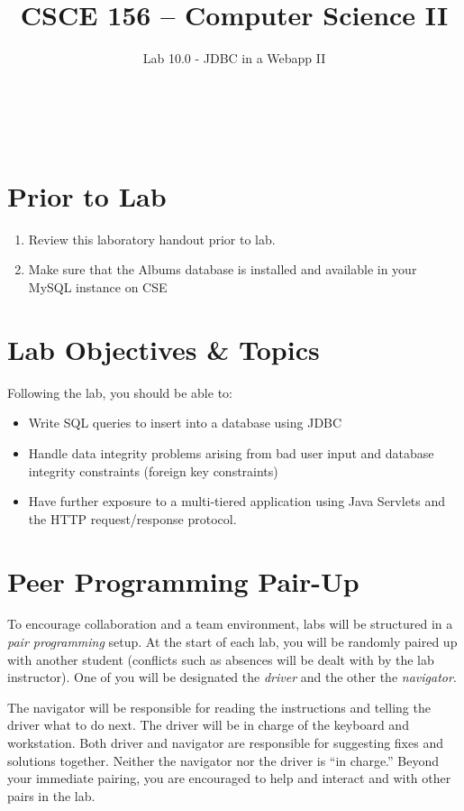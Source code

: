 \documentclass[12pt]{scrartcl}
\title{CSCE 156 -- Computer Science II}
\subtitle{Lab 10.0 - JDBC in a Webapp II}
\author{~}
\date{~}
\begin{document}
\maketitle

\section*{Prior to Lab}

\begin{enumerate}
  \item Review this laboratory handout prior to lab.
  \item Make sure that the Albums database is installed and available 
  	in your MySQL instance on CSE
\end{enumerate}

\section*{Lab Objectives \& Topics}
Following the lab, you should be able to:
\begin{itemize}
  \item Write SQL queries to insert into a database using JDBC
  \item Handle data integrity problems arising from bad user input 
    and database integrity constraints (foreign key constraints)
  \item Have further exposure to a multi-tiered application using 
    Java Servlets and the HTTP request/response protocol.
\end{itemize}


\section*{Peer Programming Pair-Up}

To encourage collaboration and a team environment, labs will be
structured in a \emph{pair programming} setup.  At the start of
each lab, you will be randomly paired up with another student 
(conflicts such as absences will be dealt with by the lab instructor).
One of you will be designated the \emph{driver} and the other
the \emph{navigator}.  

The navigator will be responsible for reading the instructions and
telling the driver what to do next.  The driver will be in charge of the
keyboard and workstation.  Both driver and navigator are responsible
for suggesting fixes and solutions together.  Neither the navigator
nor the driver is ``in charge.''  Beyond your immediate pairing, you
are encouraged to help and interact and with other pairs in the lab.
\end{document}
